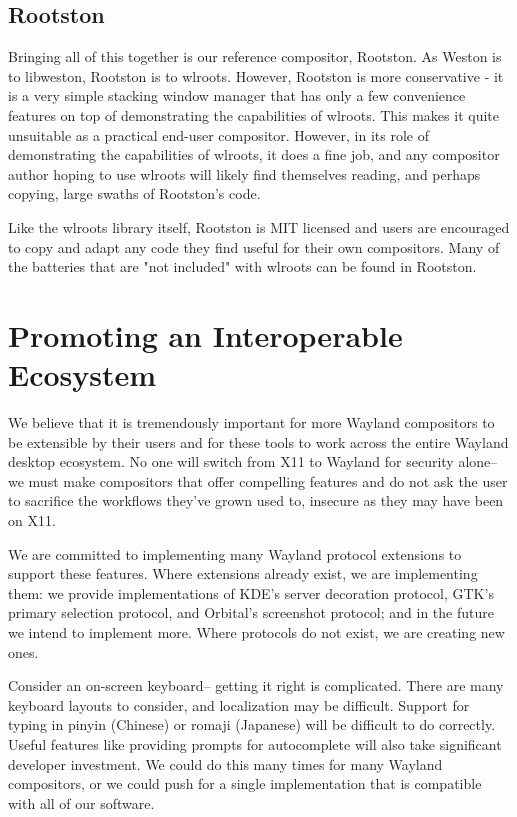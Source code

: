 \documentclass{article}
\begin{document}
\subsection{Rootston}

Bringing all of this together is our reference compositor, Rootston. As Weston
is to libweston, Rootston is to wlroots. However, Rootston is more conservative -
it is a very simple stacking window manager that has only a few convenience
features on top of demonstrating the capabilities of wlroots. This makes it
quite unsuitable as a practical end-user compositor. However, in its role of
demonstrating the capabilities of wlroots, it does a fine job, and any
compositor author hoping to use wlroots will likely find themselves reading, and
perhaps copying, large swaths of Rootston's code.

Like the wlroots library itself, Rootston is MIT licensed and users are
encouraged to copy and adapt any code they find useful for their own
compositors. Many of the batteries that are "not included" with wlroots can be
found in Rootston.

\section{Promoting an Interoperable Ecosystem}

We believe that it is tremendously important for more Wayland compositors to be
extensible by their users and for these tools to work across the entire Wayland
desktop ecosystem. No one will switch from X11 to Wayland for security alone--
we must make compositors that offer compelling features and do not ask the user
to sacrifice the workflows they've grown used to, insecure as they may have been
on X11.

We are committed to implementing many Wayland protocol extensions to support
these features. Where extensions already exist, we are implementing them: we
provide implementations of KDE's server decoration protocol, GTK's primary
selection protocol, and Orbital's screenshot protocol; and in the future we
intend to implement more. Where protocols do not exist, we are creating new
ones.

Consider an on-screen keyboard-- getting it right is complicated. There are
many keyboard layouts to consider, and localization may be difficult. Support
for typing in pinyin (Chinese) or romaji (Japanese) will be difficult to do
correctly. Useful features like providing prompts for autocomplete will also
take significant developer investment. We could do this many times for many
Wayland compositors, or we could push for a single implementation that is
compatible with all of our software.
\end{document}
